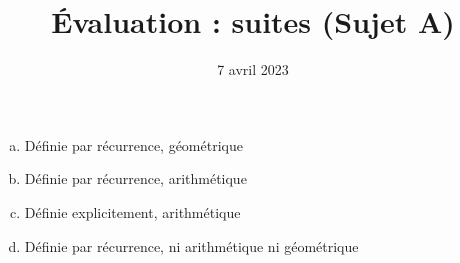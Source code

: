 \documentclass[
	classe=$1^{ere}STI2D$
]{évaluation}
\date{7 avril 2023}
\begin{document}
\newcommand{\makeCorrection}{}
\title{Évaluation : suites (Sujet A)}
\maketitle

\begin{exercice}
	\begin{enumerate}[a)]
		\item Définie par récurrence, géométrique
		\item Définie par récurrence, arithmétique
		\item Définie explicitement, arithmétique
		\item Définie par récurrence, ni arithmétique ni géométrique
	\end{enumerate}
\end{exercice}
\end{document}
